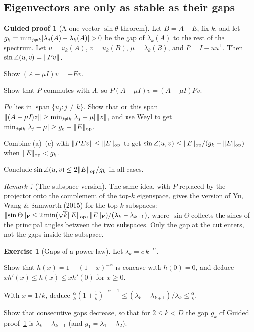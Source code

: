 \documentclass[11pt,a4paper]{article}
\DeclareMathOperator{\spn}{span}
\DeclarePairedDelimiter{\norm}{\lVert}{\rVert}
\DeclarePairedDelimiter{\abs}{\lvert}{\rvert}
\newcommand{\op}{\mathrm{op}}
\newcommand{\F}{\mathrm{F}}
\theoremstyle{plain}
\theoremstyle{definition}
\newtheorem{exercise}[proposition]{Exercise}
\newtheorem{guided}[proposition]{Guided proof}
\theoremstyle{remark}
\newtheorem{remark}[proposition]{Remark}
\begin{document}
\subsection{Eigenvectors are only as stable as their gaps}

\begin{guided}[A one-vector $\sin\theta$ theorem]\label{gp:sintheta}
Let $B=A+E$, fix $k$, and let $g_k=\min_{j\ne k}\abs{\lambda_j(A)-\lambda_k(A)}>0$ be the gap of $\lambda_k(A)$ to the
rest of the spectrum. Let $u=u_k(A)$, $v=u_k(B)$, $\mu=\lambda_k(B)$, and $P=I-uu^\top$. Then
$\sin\angle(u,v)=\norm{Pv}$.
\begin{steps}
\item Show $(A-\mu I)v=-Ev$.
\item Show that $P$ commutes with $A$, so $P(A-\mu I)v=(A-\mu I)Pv$.
\item $Pv$ lies in $\spn\{u_j:j\ne k\}$. Show that on this span $\norm{(A-\mu I)z}\ge\min_{j\ne k}\abs{\lambda_j-\mu}\,\norm{z}$,
  and use Weyl to get $\min_{j\ne k}\abs{\lambda_j-\mu}\ge g_k-\norm{E}_\op$.
\item Combine (a)--(c) with $\norm{PEv}\le\norm{E}_\op$ to get $\sin\angle(u,v)\le\norm{E}_\op/(g_k-\norm{E}_\op)$
  when $\norm{E}_\op<g_k$.
\item Conclude $\sin\angle(u,v)\le2\norm{E}_\op/g_k$ in all cases.
\end{steps}
\end{guided}

\begin{remark}[The subspace version]\label{rem:dk}
The same idea, with $P$ replaced by the projector onto the complement of the top-$k$ eigenspace, gives the version of
Yu, Wang \& Samworth (2015) for the top-$k$ subspaces: $\norm{\sin\Theta}_\F\le2\min(\sqrt k\norm{E}_\op,\norm{E}_\F)/(\lambda_k-\lambda_{k+1})$,
where $\sin\Theta$ collects the sines of the principal angles between the two subspaces. Only the gap at the cut
enters, not the gaps inside the subspace.
\end{remark}

\begin{exercise}[Gaps of a power law]\label{ex:gaps}
Let $\lambda_k=c\,k^{-\alpha}$.
\begin{steps}
\item Show that $h(x)=1-(1+x)^{-\alpha}$ is concave with $h(0)=0$, and deduce $xh'(x)\le h(x)\le xh'(0)$ for $x\ge0$.
\item With $x=1/k$, deduce $\frac{\alpha}{k}(1+\frac1k)^{-\alpha-1}\le(\lambda_k-\lambda_{k+1})/\lambda_k\le\frac{\alpha}{k}$.
\item Show that consecutive gaps decrease, so that for $2\le k<D$ the gap $g_k$ of Guided proof~\ref{gp:sintheta} is
  $\lambda_k-\lambda_{k+1}$ (and $g_1=\lambda_1-\lambda_2$).
\end{steps}
\end{exercise}
\end{document}
